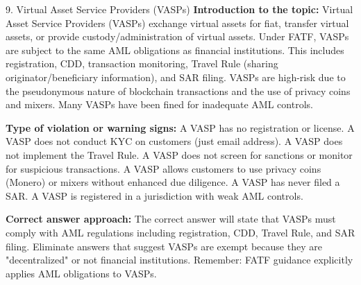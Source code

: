 \documentclass[11pt,a4paper]{beamer}
\begin{document}
\begin{frame}{9. Virtual Asset Service Providers (VASPs)}
\tiny
\noindent\textbf{Introduction to the topic:} Virtual Asset Service Providers (VASPs) exchange virtual assets for fiat, transfer virtual assets, or provide custody/administration of virtual assets. Under FATF, VASPs are subject to the same AML obligations as financial institutions. This includes registration, CDD, transaction monitoring, Travel Rule (sharing originator/beneficiary information), and SAR filing. VASPs are high-risk due to the pseudonymous nature of blockchain transactions and the use of privacy coins and mixers. Many VASPs have been fined for inadequate AML controls.

\vspace{0.1cm}
\noindent\textbf{Type of violation or warning signs:} A VASP has no registration or license. A VASP does not conduct KYC on customers (just email address). A VASP does not implement the Travel Rule. A VASP does not screen for sanctions or monitor for suspicious transactions. A VASP allows customers to use privacy coins (Monero) or mixers without enhanced due diligence. A VASP has never filed a SAR. A VASP is registered in a jurisdiction with weak AML controls.

\vspace{0.1cm}
\noindent\textbf{Correct answer approach:} The correct answer will state that VASPs must comply with AML regulations including registration, CDD, Travel Rule, and SAR filing. Eliminate answers that suggest VASPs are exempt because they are "decentralized" or not financial institutions. Remember: FATF guidance explicitly applies AML obligations to VASPs.
\end{frame}
\end{document}

